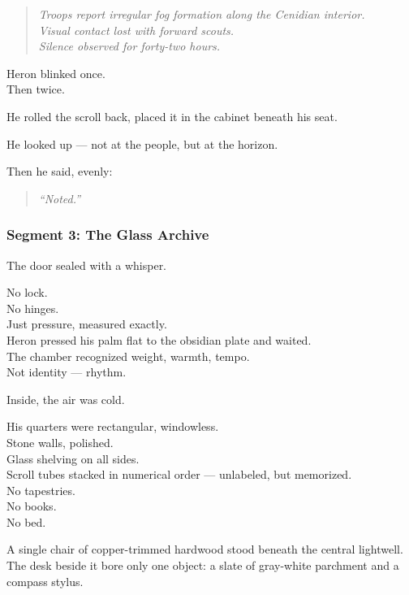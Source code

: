 \documentclass[9pt]{article}
\begin{document}
\begin{quote}
\textit{Troops report irregular fog formation along the Cenidian interior.\\
Visual contact lost with forward scouts.\\
Silence observed for forty-two hours.}
\end{quote}

Heron blinked once.\\
Then twice.

He rolled the scroll back, placed it in the cabinet beneath his seat.

He looked up — not at the people, but at the horizon.

Then he said, evenly:

\begin{quote}
\textit{“Noted.”}
\end{quote}

\newpage

\subsubsection*{Segment 3: The Glass Archive}

The door sealed with a whisper.

No lock.\\
No hinges.\\
Just pressure, measured exactly.\\
Heron pressed his palm flat to the obsidian plate and waited.\\
The chamber recognized weight, warmth, tempo.\\
Not identity — rhythm.

Inside, the air was cold.

\vspace{1em}

His quarters were rectangular, windowless.\\
Stone walls, polished.\\
Glass shelving on all sides.\\
Scroll tubes stacked in numerical order — unlabeled, but memorized.\\
No tapestries.\\
No books.\\
No bed.

A single chair of copper-trimmed hardwood stood beneath the central lightwell.\\
The desk beside it bore only one object: a slate of gray-white parchment and a compass stylus.
\end{document}
